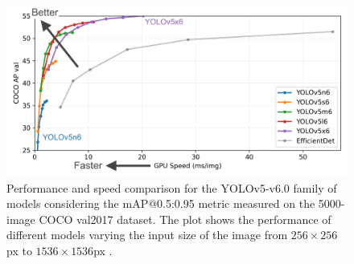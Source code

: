 \begin{figure}%
	\centering

    \begin{center}
        \includegraphics[width=\columnwidth]{images/yolov5-sizes.png}
    \end{center}

	\caption{Performance and speed comparison for the YOLOv5-v6.0 family of models considering the mAP@0.5:0.95 metric measured on the 5000-image COCO val2017 \cite{lin2014microsoft} dataset. The plot shows the performance of different models varying the input size of the image from $256 \times 256$px to $1536 \times 1536$px \cite{glenn_jocher_2021_5563715}.}
	\label{fig:yolo-sizes}%
\end{figure}


